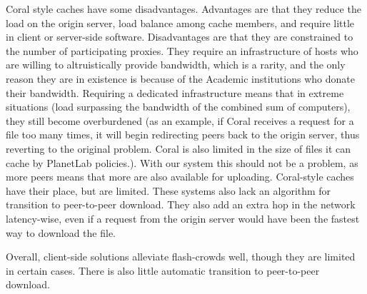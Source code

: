 Coral style caches have some disadvantages.  Advantages are that they reduce the load on the origin server, load balance among cache members, and require little in client or server-side software.  Disadvantages are that they are constrained to the number of participating proxies. They require an infrastructure of hosts who are willing to altruistically provide bandwidth, which is a rarity, and the only reason they are in existence is because of the Academic institutions who donate their bandwidth.  Requiring a dedicated infrastructure means that in extreme situations (load surpassing the bandwidth of the combined sum of computers), they still become overburdened (as an example, if Coral receives a request for a file too many times, it will begin redirecting peers back to the origin server, thus reverting to the original problem.  Coral is also limited in the size of files it can cache by PlanetLab policies.).  With our system this should not be a problem, as more peers means that more are also available for uploading.  Coral-style caches have their place, but are limited.  These systems also lack an algorithm for transition to peer-to-peer download.  They also add an extra hop in the network latency-wise, even if a request from the origin server would have been the fastest way to download the file.    


Overall, client-side solutions alleviate flash-crowds well, though they are limited in certain cases. There is also little automatic transition to peer-to-peer download.

